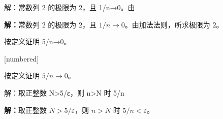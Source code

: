 \documentclass[aspectratio=169,10pt,fontset=fandol]{ctexbeamer}
\makeatletter
\newcommand{\mathagentexerciselabelcontext}[1]{%
\hypertarget<1>{#1}{}%
\edef\@currentHref{#1}%
}
\makeatother
\begin{document}
\begin{frame}[t,fragile]{解：常数列 2 的极限为 2，且 1/n→0。由}
\normalsize
{\normalsize
\par\noindent\textbf{解：}常数列 $2$ 的极限为 $2$，且 $1/n\to0$。由加法法则，所求极限为 $2$。\par

}
\end{frame}
\begin{frame}[t,fragile]{按定义证明 5/n→0。}
\normalsize
{\normalsize
[numbered]
\mathagentexerciselabelcontext{mathagent.exercise.U0016.0}
\begin{exercise}
\label{mathagent:exercise:f708d5de6eeb2a0d1d46cddf76922686b9f273c43bd0798e15293c1e0afd54ab}
按定义证明 $5/n\to0$。
\end{exercise}
}
\end{frame}
\begin{frame}[t,fragile]{解：取正整数 N>5/ε，则 n>N 时 5/n}
\normalsize
{\normalsize
\par\noindent\textbf{解：}取正整数 $N>5/\varepsilon$，则 $n>N$ 时 $5/n<\varepsilon$。\par

}
\end{frame}
\end{document}

